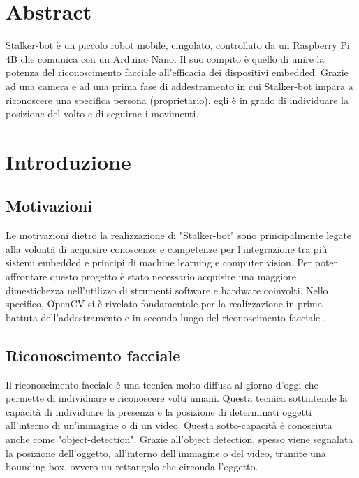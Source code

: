 \documentclass[12pt]{report}
\begin{document}
\vfill

\clearpage
\null
\thispagestyle{empty}
\clearpage

\chapter*{Abstract}
Stalker-bot \`e un piccolo robot mobile, cingolato, controllato da un Raspberry Pi 4B che comunica con un Arduino Nano. Il suo compito \`e quello di unire la potenza del riconoscimento facciale all'efficacia dei dispositivi embedded. Grazie ad una camera e ad una prima fase di addestramento in cui Stalker-bot impara a riconoscere una specifica persona (proprietario), egli \`e in grado di individuare la posizione del volto e di seguirne i movimenti.

\tableofcontents
\thispagestyle{empty}

 

\clearpage
\null
\thispagestyle{empty}
\clearpage

\pagestyle{plain}
\chapter*{Introduzione}

\section*{Motivazioni}
Le motivazioni dietro la realizzazione di "Stalker-bot" sono principalmente legate alla volont\`a di acquisire conoscenze e competenze per l'integrazione tra pi\`u sistemi embedded e principi di machine learning e computer vision. Per poter affrontare questo progetto \`e stato necessario acquisire una maggiore dimestichezza nell'utilizzo di strumenti software e hardware coinvolti. Nello specifico, OpenCV si \`e rivelato fondamentale per la realizzazione in prima battuta dell'addestramento e in secondo luogo del riconoscimento facciale .
	
\section*{Riconoscimento facciale}
Il riconoscimento facciale \`e una tecnica molto diffusa al giorno d'oggi che permette di individuare e riconoscere volti umani.
Questa tecnica sottintende la capacit\`a di individuare la presenza e la posizione di determinati oggetti all'interno di un'immagine o di un video. Questa sotto-capacit\`a \`e conosciuta anche come "object-detection".
Grazie all'object detection, spesso viene segnalata la posizione dell'oggetto, all'interno dell'immagine o del video, tramite una bounding box, ovvero un rettangolo che circonda l'oggetto.
\end{document}
